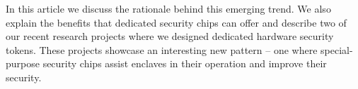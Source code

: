 In this article we discuss the rationale behind this emerging trend. We also explain the benefits that dedicated security chips can offer and describe two of our recent research projects where we designed dedicated hardware security tokens. These projects showcase an interesting new pattern -- one where special-purpose security chips assist enclaves in their operation and improve their security. 
